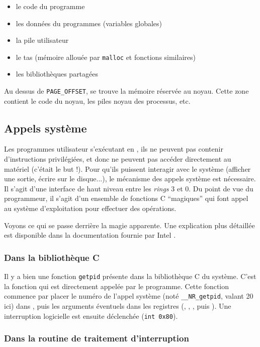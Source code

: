 \begin{itemize}
\item le code du programme
\item les données du programmes (variables globales)
\item la pile utilisateur
\item le tas (mémoire allouée par \texttt{malloc} et fonctions similaires)
\item les bibliothèques partagées
\end{itemize}

Au dessus de \texttt{PAGE\_OFFSET}, se trouve la mémoire réservée au noyau.
Cette zone contient le code du noyau, les piles noyau des processus, etc.

\subsection{Appels système}
\label{sec:impl-syscall}


Les programmes utilisateur s'exécutant en , ils ne peuvent pas
contenir d'instructions privilégiées, et donc ne peuvent pas accéder directement
au matériel (c'était le but !). Pour qu'ils puissent interagir avec le système
(afficher une sortie, écrire sur le disque...), le mécanisme des appels système
est nécessaire. Il s'agit d'une interface de haut niveau entre les \emph{rings}
3 et 0. Du point de vue du programmeur, il s'agit d'un ensemble de fonctions C
``magiques'' qui font appel au système d'exploitation pour effectuer des
opérations.

Voyons ce qui se passe derrière la magie apparente. Une explication plus
détaillée est disponible dans la documentation fournie par Intel
\cite{intelsys}.

\subsubsection{Dans la bibliothèque C}

Il y a bien une fonction \texttt{getpid} présente dans la bibliothèque C du
système. C'est la fonction qui est directement appelée par le programme. Cette
fonction commence par placer le numéro de l'appel système (noté
\texttt{\_\_NR\_getpid}, valant 20 ici) dans \eax, puis les arguments éventuels
dans les registres (\ebx, \ecx, \edx, \esi puis \edi). Une interruption
logicielle est ensuite déclenchée (\texttt{int 0x80}).

\subsubsection{Dans la routine de traitement d'interruption}


